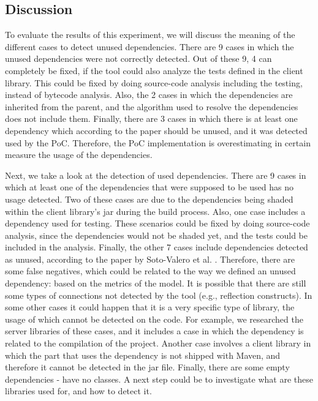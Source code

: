 \subsection{Discussion}
To evaluate the results of this experiment, we will discuss the meaning of the different cases to detect unused dependencies. There are 9 cases in which the unused dependencies were not correctly detected. Out of these 9, 4 can completely be fixed, if the tool could also analyze the tests defined in the client library. This could be fixed by doing source-code analysis including the testing, instead of bytecode analysis. Also, the 2 cases in which the dependencies are inherited from the parent, and the algorithm used to resolve the dependencies does not include them. Finally, there are 3 cases in which there is at least one dependency which according to the paper should be unused, and it was detected used by the PoC. Therefore, the PoC implementation is overestimating in certain measure the usage of the dependencies.

Next, we take a look at the detection of used dependencies. There are 9 cases in which at least one of the dependencies that were supposed to be used has no usage detected. Two of these cases are due to the dependencies being shaded within the client library's jar during the build process. Also, one case includes a dependency used for testing. These scenarios could be fixed by doing source-code analysis, since the dependencies would not be shaded yet, and the tests could be included in the analysis. Finally, the other 7 cases include dependencies detected as unused, according to the paper by Soto-Valero et al. \cite{soto2020comprehensive}. Therefore, there are some false negatives, which could be related to the way we defined an unused dependency: based on the metrics of the model. It is possible that there are still some types of connections not detected by the tool (e.g., reflection constructs). In some other cases it could happen that it is a very specific type of library, the usage of which cannot be detected on the code. For example, we researched the server libraries of these cases, and it includes a case in which the dependency is related to the compilation of the project. Another case involves a client library in which the part that uses the dependency is not shipped with Maven, and therefore it cannot be detected in the jar file. Finally, there are some empty dependencies - have no classes. A next step could be to investigate what are these libraries used for, and how to detect it.

